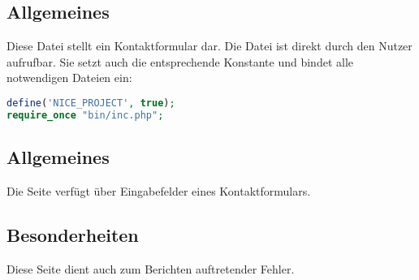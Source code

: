 \subsection{Allgemeines} Diese Datei stellt ein Kontaktformular dar.
Die Datei ist direkt durch den Nutzer aufrufbar. Sie setzt auch die entsprechende Konstante und bindet alle notwendigen Dateien ein:
\begin{lstlisting}[language=php]
define('NICE_PROJECT', true);
require_once "bin/inc.php";
\end{lstlisting}
\subsection{Allgemeines}
Die Seite verfügt über Eingabefelder eines Kontaktformulars.
\subsection{Besonderheiten}
Diese Seite dient auch zum Berichten auftretender Fehler.